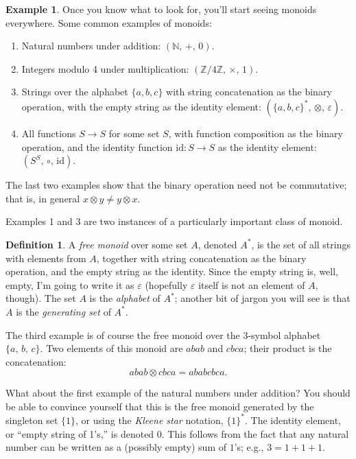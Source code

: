 \documentclass[a4paper,headsepline,bibliography=totoc,toc=flat,fleqn,twoside=semi]{scrbook}
\theoremstyle{definition}
\newtheorem{definition}{Definition}[chapter]
\theoremstyle{definition}
\newtheorem{example}{Example}[chapter]
\theoremstyle{definition}
\begin{document}
\begin{example}
Once you know what to look for, you'll start seeing monoids everywhere. Some common examples of monoids:

\begin{enumerate}
\item Natural numbers under addition: $(\mathbb{N},\, +,\, 0)$.
\item Integers modulo 4 under multiplication: $(\mathbb{Z}/4\mathbb{Z},\, \times,\, 1)$.
\item Strings over the alphabet $\{a,b,c\}$ with string concatenation as the binary operation, with the empty string as the identity element: $(\{a, b, c\}^*,\, \otimes,\, \varepsilon)$.
\item All functions $S\rightarrow S$ for some set $S$, with function composition as the binary operation, and the identity function $\mathrm{id}\colon S\rightarrow S$ as the identity element: $(S^S,\, \circ,\, \mathrm{id})$.
\end{enumerate}
\end{example}
The last two examples show that the binary operation need not be commutative; that is, in general $x\otimes y \neq y\otimes x$.

Examples 1 and 3 are two instances of a particularly important class of monoid.
\begin{definition}
A \emph{free monoid} over some set $A$, denoted $A^*$, is the set of all strings with elements from $A$, together with string concatenation as the binary operation, and the empty string as the identity. Since the empty string is, well, empty, I'm going to write it as $\varepsilon$ (hopefully $\varepsilon$ itself is not an element of $A$, though). The set $A$ is the \emph{alphabet} of $A^*$; another bit of jargon you will see is that $A$ is the \emph{generating set} of $A^*$.
\end{definition}

The third example is of course the free monoid over the 3-symbol alphabet $\{a,\,b,\,c\}$. Two elements of this monoid are $abab$ and $cbca$; their product is the concatenation:
\[abab\otimes cbca=ababcbca.\]

What about the first example of the natural numbers under addition? You should be able to convince yourself that this is the free monoid generated by the singleton set $\{1\}$, or using the \emph{Kleene star} notation, $\{1\}^*$. The identity element, or ``empty string of 1's,'' is denoted $0$. This follows from the fact that any natural number can be written as a (possibly empty) sum of $1$'s; e.g., $3=1+1+1$.
\end{document}
